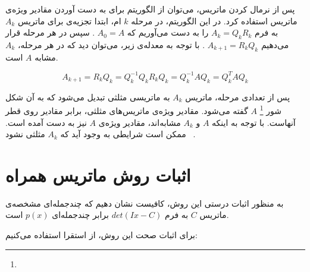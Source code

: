 پس از نرمال کردن ماتریس، می‌توان از الگوریتم
برای به دست آوردن مقادیر ویژه‌ی ماتریس استفاده کرد.
در این الگوریتم، در مرحله
$k$
ام،
ابتدا تجزیه‌ی
برای ماتریس
$A_k$
به فرم
$A_k = Q_k R_k$
را به
دست می‌آوریم که
$A_0 = A$
.
سپس در هر مرحله
قرار می‌دهیم
$A_{k + 1} = R_k Q_k$
.
با توجه به معدله‌ی زیر، می‌توان دید که در هر مرحله،
$A_k$
مشابه
$A$
است.

\begin{equation}
  A_{k+1} = R_k Q_k = Q_{k}^{-1} Q_k R_k Q_k = Q_k^{-1} A Q_k = Q_k^T A Q_k
\end{equation}

پس از تعدادی مرحله، ماتریس
$A_k$
به ماتریسی مثلثی تبدیل می‌شود که به آن شکل شور
\footnote{}
$A$
گفته می‌شود.
مقادیر ویژه‌ی ماتریس‌های مثلثی، برابر مقادیر روی قطر آنهاست. با توجه به اینکه
$A$
و
$A_k$
مشابه‌اند، مقادیر ویژه‌ی
$A$
نیز به دست آمده است.
ممکن است شرایطی به وجود آید که
$A_k$
مثلثی نشود~\cite{golub2013matrix}
.


\section{اثبات روش ماتریس همراه}

به منظور اثبات درستی این روش، کافیست نشان دهیم که چندجمله‌ای مشخصه‌ی ماتریس
$C$
به فرم
$det(Ix - C)$
برابر چندجمله‌ای
$p(x)$
است.

برای اثبات صحت این روش، از استقرا استفاده می‌کنیم:

